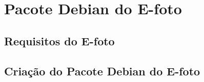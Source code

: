 \chapter{Pacote Debian do E-foto}
\section{Requisitos do E-foto}
\section{Criação do Pacote Debian do E-foto}

